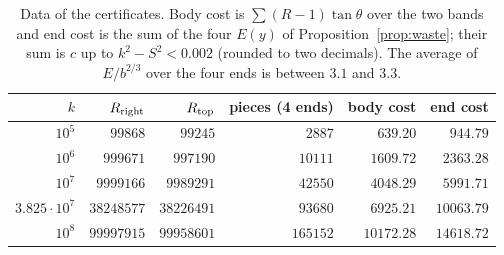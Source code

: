 \documentclass[11pt]{amsart}
\theoremstyle{definition}
\theoremstyle{remark}
\numberwithin{equation}{section}
\begin{document}
\begin{table}[ht]
\centering
\small
\begin{tabular}{rrrrrr}
\toprule
$k$ & $R_{\rm right}$ & $R_{\rm top}$ & pieces (4 ends) & body cost & end cost\\
\midrule
$10^5$ & $99868$ & $99245$ & $2887$ & $639.20$ & $944.79$\\
$10^6$ & $999671$ & $997190$ & $10111$ & $1609.72$ & $2363.28$\\
$10^7$ & $9999166$ & $9989291$ & $42550$ & $4048.29$ & $5991.71$\\
$3.825\cdot10^7$ & $38248577$ & $38226491$ & $93680$ & $6925.21$ & $10063.79$\\
$10^8$ & $99997915$ & $99958601$ & $165152$ & $10172.28$ & $14618.72$\\
\bottomrule
\end{tabular}
\medskip
\caption{Data of the certificates. Body cost is $\sum(R-1)\tan\theta$ over the two bands and end cost is the sum of the
four $E(y)$ of Proposition~\ref{prop:waste}; their sum is $c$ up to $k^2-S^2<0.002$ (rounded to two decimals). The
average of $E/b^{2/3}$ over the four ends is between $3.1$ and $3.3$.}
\label{tab:certdata}
\end{table}
\end{document}
